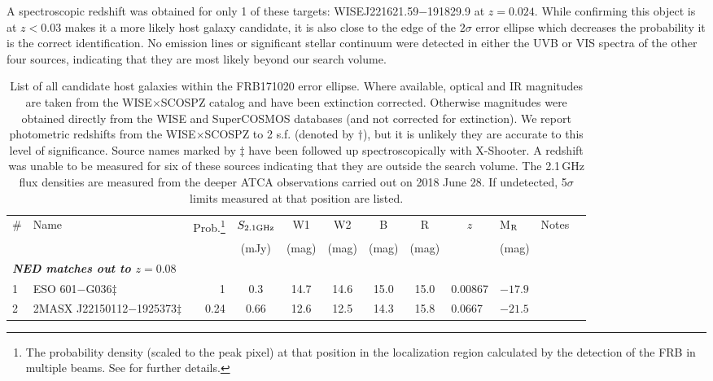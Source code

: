 \documentclass[twocolumn]{aastex63}
\begin{document}
A spectroscopic redshift was obtained for only 1 of these targets: WISEJ221621.59$-$191829.9 at $z=0.024$. While confirming this object is at $z<0.03$ makes it a more likely host galaxy candidate, it is also close to the edge of the $2\sigma$ error ellipse which decreases the probability it is the correct identification. No emission lines or significant stellar continuum were detected in either the UVB or VIS spectra of the other four sources, indicating that they are most likely beyond our 
search volume. 

\begin{table*}
\caption{List of all candidate host galaxies within the FRB171020 error ellipse. Where available, optical and IR magnitudes are taken from the WISE$\times$SCOSPZ catalog and have been extinction corrected. Otherwise magnitudes were obtained directly from the WISE and SuperCOSMOS databases (and not corrected for extinction). We report photometric redshifts from the WISE$\times$SCOSPZ to 2 s.f. (denoted by $\dagger$), but it is unlikely they are accurate to this level of significance. Source names marked by $\ddagger$ have been followed up spectroscopically with X-Shooter. A redshift was unable to be measured for six of these sources indicating that they are outside the search volume. The 2.1\,GHz flux densities are measured from the deeper ATCA observations carried out on 2018 June 28. If undetected, 5$\sigma$ limits measured at that position are listed. \label{candidates_tab}}
\begin{tabular}{llrccccclllc}
\hline
\# & Name & Prob.\footnote{The probability density (scaled to the peak pixel) at that position in the localization region calculated by the detection of the FRB in multiple beams. See \citet{Bannisteretal2017} for further details.} & $S_{\rm 2.1 GHz}$ & W1 & W2 & B & R & \multicolumn{1}{c}{$z$} & M$_{\rm R}$ & Notes \\
& & & (mJy) & (mag) & (mag) & (mag) & (mag) & & (mag) \\
\hline
\multicolumn{9}{l}{\emph{\bf NED matches out to $z=0.08$}} \\
1 & ESO 601$-$G036$\ddagger$ & 1 & 0.3 & 14.7 & 14.6 & 15.0 & 15.0 & 0.00867 & $-17.9$ &  \\
2 & 2MASX J22150112$-$1925373$\ddagger$ & 0.24 & 0.66 & 12.6 & 12.5 & 14.3 & 15.8 & 0.0667 & $-21.5$ & \\ 

\end{tabular}
\end{table*}
\end{document}
